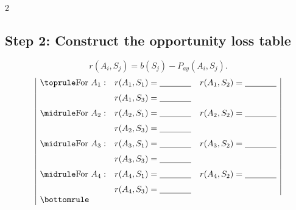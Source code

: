 \begin{multicols}{2}
	\subsection*{Step 2: Construct the opportunity loss table}
	\[
	r(A_i,S_j)
	=
	b(S_j)-P_{ay}(A_i,S_j).
	\]
	\[
	\begin{array}{|lll|}
		\toprule
		\text{For } A_1: &
		r(A_1,S_1) = \underline{\hspace{1.3cm}}
		&
		r(A_1,S_2) = \underline{\hspace{1.3cm}}
		\\[6pt]
		&
		r(A_1,S_3) = \underline{\hspace{1.3cm}}
		&
		\\[6pt]
		\midrule
		\text{For } A_2: &
		r(A_2,S_1) = \underline{\hspace{1.3cm}}
		&
		r(A_2,S_2) = \underline{\hspace{1.3cm}}
		\\[6pt]
		&
		r(A_2,S_3) = \underline{\hspace{1.3cm}}
		&
		\\[6pt]
		\midrule
		\text{For } A_3: &
		r(A_3,S_1) = \underline{\hspace{1.3cm}}
		&
		r(A_3,S_2) = \underline{\hspace{1.3cm}}
		\\[6pt]
		&
		r(A_3,S_3) = \underline{\hspace{1.3cm}}
		&
		\\[6pt]
		\midrule
		\text{For } A_4: &
		r(A_4,S_1) = \underline{\hspace{1.3cm}}
		&
		r(A_4,S_2) = \underline{\hspace{1.3cm}}
		\\[6pt]
		&
		r(A_4,S_3) = \underline{\hspace{1.3cm}}
		&
		\\
		\bottomrule
	\end{array}
	\]
	

\end{multicols}
